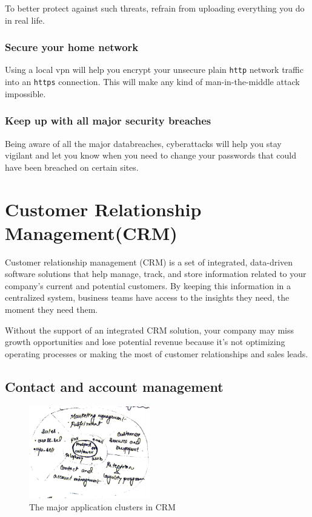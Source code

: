 \documentclass[12pt, a4paper]{article}
\begin{document}
To better protect against such threats, refrain from uploading everything you
do in real life.

\subsubsection{Secure your home network}
Using a local vpn will help you encrypt your unsecure plain \verb+http+ network
traffic into an \verb+https+ connection. This will make any kind of
man-in-the-middle attack impossible.

\subsubsection{Keep up with all major security breaches}
Being aware of all the major databreaches, cyberattacks will help you stay
vigilant and let you know when you need to change your passwords that could
have been breached on certain sites.%

\section{Customer Relationship Management(CRM)}%
Customer relationship management (CRM) is a set of integrated, data-driven
software solutions that help manage, track, and store information related to
your company’s current and potential customers. By keeping this information in
a centralized system, business teams have access to the insights they need, the
moment they need them.

Without the support of an integrated CRM solution, your company may miss growth
opportunities and lose potential revenue because it’s not optimizing operating
processes or making the most of customer relationships and sales leads.

\subsection{Contact and account management}
\begin{figure}[h]
  \centering
  \includegraphics[width=0.47\textwidth]{CRMapplicationcluster}
  \caption{The major application clusters in CRM}
\end{figure}%
 
\end{document}
